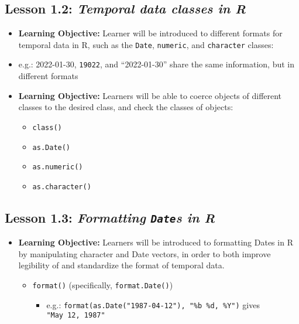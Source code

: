 \documentclass[
]{book}
\providecommand{\tightlist}{%
  \setlength{\itemsep}{0pt}\setlength{\parskip}{0pt}}
\begin{document}
\hypertarget{lesson-1.2-temporal-data-classes-in-r}{%
\subsection*{\texorpdfstring{Lesson 1.2: \emph{Temporal data classes in R}}{Lesson 1.2: Temporal data classes in R}}\label{lesson-1.2-temporal-data-classes-in-r}}

\begin{itemize}
\tightlist
\item
  \textbf{Learning Objective:} Learner will be introduced to different formats for temporal data in R, such as the \texttt{Date}, \texttt{numeric}, and \texttt{character} classes:
\item
  e.g.: 2022-01-30, \texttt{19022}, and ``2022-01-30'' share the same information, but in different formats
\item
  \textbf{Learning Objective:} Learners will be able to coerce objects of different classes to the desired class, and check the classes of objects:

  \begin{itemize}
  \tightlist
  \item
    \texttt{class()}
  \item
    \texttt{as.Date()}
  \item
    \texttt{as.numeric()}
  \item
    \texttt{as.character()}
  \end{itemize}
\end{itemize}

\hypertarget{lesson-1.3-formatting-dates-in-r}{%
\subsection*{\texorpdfstring{Lesson 1.3: \emph{Formatting \texttt{Date}s in R}}{Lesson 1.3: Formatting Dates in R}}\label{lesson-1.3-formatting-dates-in-r}}

\begin{itemize}
\tightlist
\item
  \textbf{Learning Objective:} Learners will be introduced to formatting Dates in R by manipulating character and Date vectors, in order to both improve legibility of and standardize the format of temporal data.

  \begin{itemize}
  \tightlist
  \item
    \texttt{format()} (specifically, \texttt{format.Date()})

    \begin{itemize}
    \tightlist
    \item
      e.g.: \texttt{format(as.Date("1987-04-12"),\ "\%b\ \%d,\ \%Y")} gives \texttt{"May\ 12,\ 1987"}
    \end{itemize}
  \end{itemize}
\end{itemize}
\end{document}
